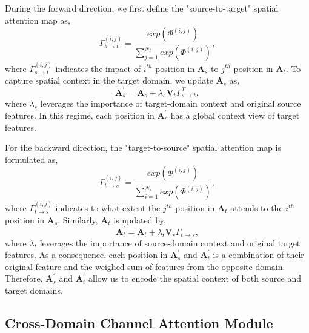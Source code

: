 \documentclass[10pt,twocolumn,letterpaper]{article}
\begin{document}
	During the forward direction, we first define the "source-to-target" spatial attention map as,
	\begin{equation}
	\Gamma_{s{\rightarrow}t}^{(i, j)} = \frac{exp(\Phi^{(i, j)})}{\sum_{j=1}^{N_t} exp(\Phi^{(i, j)})},
	\end{equation}
	where $ \Gamma_{s{\rightarrow}t}^{(i, j)} $ indicates the impact of $ i^{th} $ position in $ \textbf{A}_{s} $ to $ j^{th} $ position in $ \textbf{A}_{t} $. To capture spatial context in the target domain, we update $ \textbf{A}_{s} $ as,
	\begin{equation}
	\textbf{A}_{s}^{'} = \textbf{A}_{s} + \lambda_{s} \textbf{V}_t \Gamma_{s{\rightarrow}t}^T,
	\end{equation}
	where $ \lambda_{s} $ leverages the importance of target-domain context and original source features. In this regime, each position in $ \textbf{A}_{s}^{'} $ has a global context view of target features.

	For the backward direction, the "target-to-source" spatial attention map is formulated as,
	\begin{equation}
	\Gamma_{t{\rightarrow}s}^{(i, j)} = \frac{exp(\Phi^{(i, j)})}{\sum_{i=1}^{N_s} exp(\Phi^{(i, j)})},
	\end{equation}
	where $ \Gamma_{t{\rightarrow}s}^{(i, j)} $ indicates to what extent the $ j^{th} $ position in $ \textbf{A}_{t} $ attends to the $ i^{th} $ position in $ \textbf{A}_{s} $. Similarly, $ \textbf{A}_{t} $ is updated by,
	\begin{equation}
	\textbf{A}_{t}^{'} = \textbf{A}_{t} + \lambda_{t} \textbf{V}_s \Gamma_{t{\rightarrow}s},
	\end{equation}
	where $ \lambda_{t} $ leverages the importance of source-domain context and original target features. As a consequence, each position in $ \textbf{A}_{s}^{'} $ and $ \textbf{A}_{t}^{'} $ is a combination of their original feature and the weighed sum of features from the opposite domain. Therefore, $ \textbf{A}_{s}^{'} $ and $ \textbf{A}_{t}^{'} $ allow us to encode the spatial context of both source and target domains.


	\subsection{Cross-Domain Channel Attention Module}
\end{document}
